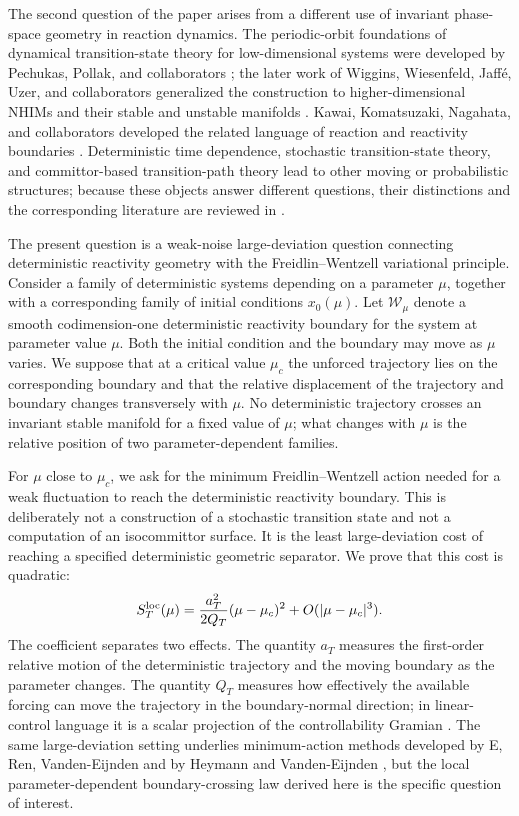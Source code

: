 \documentclass[11pt]{article}
\theoremstyle{definition}
\theoremstyle{remark}
\begin{document}
The second question of the paper arises from a different use of invariant phase-space geometry in reaction dynamics.  The periodic-orbit foundations of dynamical transition-state theory for low-dimensional systems were developed by Pechukas, Pollak, and collaborators \cite{PechukasMcLafferty1973,PollakPechukas1978,PechukasPollak1979}; the later work of Wiggins, Wiesenfeld, Jaff\'e, Uzer, and collaborators generalized the construction to higher-dimensional NHIMs and their stable and unstable manifolds \cite{WigginsWiesenfeldJaffeUzer2001,UzerEtAl2002,WaalkensSchubertWiggins2008}.  Kawai, Komatsuzaki, Nagahata, and collaborators developed the related language of reaction and reactivity boundaries \cite{KawaiKomatsuzaki2010,NagahataEtAl2013a,NagahataEtAl2013b}.  Deterministic time dependence, stochastic transition-state theory, and committor-based transition-path theory lead to other moving or probabilistic structures; because these objects answer different questions, their distinctions and the corresponding literature are reviewed in .

The present question is a weak-noise large-deviation question connecting deterministic reactivity geometry with the Freidlin--Wentzell variational principle.  Consider a family of deterministic systems depending on a parameter $\mu$, together with a corresponding family of initial conditions $x_0(\mu)$.  Let $\mathcal W_\mu$ denote a smooth codimension-one deterministic reactivity boundary for the system at parameter value $\mu$.  Both the initial condition and the boundary may move as $\mu$ varies.  We suppose that at a critical value $\mu_c$ the unforced trajectory lies on the corresponding boundary and that the relative displacement of the trajectory and boundary changes transversely with $\mu$.  No deterministic trajectory crosses an invariant stable manifold for a fixed value of $\mu$; what changes with $\mu$ is the relative position of two parameter-dependent families.

For $\mu$ close to $\mu_c$, we ask for the minimum Freidlin--Wentzell action needed for a weak fluctuation to reach the deterministic reactivity boundary.  This is deliberately not a construction of a stochastic transition state and not a computation of an isocommittor surface.  It is the least large-deviation cost of reaching a specified deterministic geometric separator.  We prove that this cost is quadratic:
\[
S_T^{\rm loc}(\mu)
=\frac{a_T^2}{2Q_T}(\mu-\mu_c)^2+O(|\mu-\mu_c|^3).
\]
The coefficient separates two effects.  The quantity $a_T$ measures the first-order relative motion of the deterministic trajectory and the moving boundary as the parameter changes.  The quantity $Q_T$ measures how effectively the available forcing can move the trajectory in the boundary-normal direction; in linear-control language it is a scalar projection of the controllability Gramian \cite{Sontag1998}.  The same large-deviation setting underlies minimum-action methods developed by E, Ren, Vanden-Eijnden and by Heymann and Vanden-Eijnden \cite{ERenVandenEijnden2004,HeymannVandenEijnden2008}, but the local parameter-dependent boundary-crossing law derived here is the specific question of interest.
\end{document}

